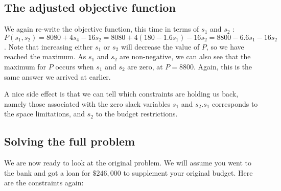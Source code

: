 \subsection{The adjusted objective function}
We again re-write the objective function, this time in terms of $s_{1}$ and $s_{2}$ : $P\left(s_{1}, s_{2}\right)=8080+4 s_{4}-16 s_{2}=8080+4\left(180-1.6 s_{1}\right)-16 s_{2}=8800-6.6 s_{1}-16 s_{2}$. Note that increasing either $s_{1}$ or $s_{2}$ will decrease the value of $P$, so we have reached the maximum. As $s_{1}$ and $s_{2}$ are non-negative, we can also see that the maximum for $P$ occurs when $s_{1}$ and $s_{2}$ are zero, at $P=8800$. Again, this is the same answer we arrived at earlier.

A nice side effect is that we can tell which constraints are holding us back, namely those associated with the zero slack variables $s_{1}$ and $s_{2} . s_{1}$ corresponds to the space limitations, and $s_{2}$ to the budget restrictions.

\subsection{Solving the full problem}
We are now ready to look at the original problem. We will assume you went to the bank and got a loan for $\$ 246,000$ to supplement your original budget. Here are the constraints again:


